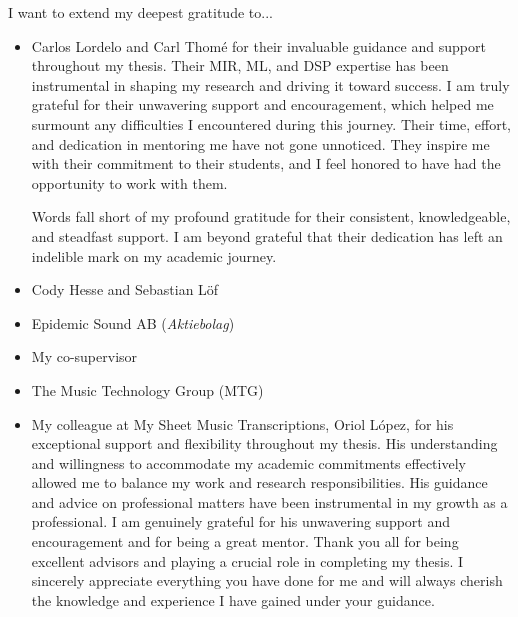 

\begin{acknowledgement}

I want to extend my deepest gratitude to...

\begin{itemize}
\item Carlos Lordelo and Carl Thomé for their invaluable guidance and support throughout my thesis. Their MIR, ML, and DSP expertise has been instrumental in shaping my research and driving it toward success. I am truly grateful for their unwavering support and encouragement, which helped me surmount any difficulties I encountered during this journey. Their time, effort, and dedication in mentoring me have not gone unnoticed. They inspire me with their commitment to their students, and I feel honored to have had the opportunity to work with them.

Words fall short of my profound gratitude for their consistent, knowledgeable, and steadfast support. I am beyond grateful that their dedication has left an indelible mark on my academic journey.

\vspace*{3mm}
\item Cody Hesse and Sebastian Löf
\vspace*{3mm}
\item Epidemic Sound AB (\textit{Aktiebolag})
\vspace*{3mm}
\item My co-supervisor
\vspace*{3mm}
\item The Music Technology Group (MTG)
\vspace*{3mm}
\item My colleague at My Sheet Music Transcriptions, Oriol López, for his exceptional support and flexibility throughout my thesis. His understanding and willingness to accommodate my academic commitments effectively allowed me to balance my work and research responsibilities. His guidance and advice on professional matters have been instrumental in my growth as a professional. I am genuinely grateful for his unwavering support and encouragement and for being a great mentor.
\vspace*{3mm}
Thank you all for being excellent advisors and playing a crucial role in completing my thesis. I sincerely appreciate everything you have done for me and will always cherish the knowledge and experience I have gained under your guidance.
\vspace*{3mm}
\end{itemize}

\newpage
\end{acknowledgement}